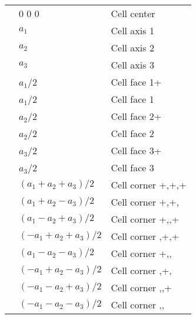 \documentclass[letterpaper,10pt,english]{sphinxmanual}
\begin{document}
\begin{savenotes}\sphinxattablestart
\centering
{}\label{\detokenize{hamiltonianobservable:table8}}\nobreak
\begin{tabulary}{\linewidth}[t]{|T|T|T|}
\hline
\sphinxstyletheadfamily 
{}
&\sphinxstyletheadfamily 
{}
&\sphinxstyletheadfamily 
{}
\\
\hline
{}
&
0 0 0
&
Cell center
\\
\hline
{}
&
\(a_1\)
&
Cell axis 1
\\
\hline
{}
&
\(a_2\)
&
Cell axis 2
\\
\hline
{}
&
\(a_3\)
&
Cell axis 3
\\
\hline
{}
&
\(a_1\)/2
&
Cell face 1+
\\
\hline
{}
&
\sphinxhyphen{}\(a_1\)/2
&
Cell face 1\sphinxhyphen{}
\\
\hline
{}
&
\(a_2\)/2
&
Cell face 2+
\\
\hline
{}
&
\sphinxhyphen{}\(a_2\)/2
&
Cell face 2\sphinxhyphen{}
\\
\hline
{}
&
\(a_3\)/2
&
Cell face 3+
\\
\hline
{}
&
\sphinxhyphen{}\(a_3\)/2
&
Cell face 3\sphinxhyphen{}
\\
\hline
{}
&
\((a_1+a_2+a_3)/2\)
&
Cell corner +,+,+
\\
\hline
{}
&
\((a_1+a_2-a_3)/2\)
&
Cell corner +,+,\sphinxhyphen{}
\\
\hline
{}
&
\((a_1-a_2+a_3)/2\)
&
Cell corner +,\sphinxhyphen{},+
\\
\hline
{}
&
\((-a_1+a_2+a_3)/2\)
&
Cell corner \sphinxhyphen{},+,+
\\
\hline
{}
&
\((a_1-a_2-a_3)/2\)
&
Cell corner +,\sphinxhyphen{},\sphinxhyphen{}
\\
\hline
{}
&
\((-a_1+a_2-a_3)/2\)
&
Cell corner \sphinxhyphen{},+,\sphinxhyphen{}
\\
\hline
{}
&
\((-a_1-a_2+a_3)/2\)
&
Cell corner \sphinxhyphen{},\sphinxhyphen{},+
\\
\hline
{}
&
\((-a_1-a_2-a_3)/2\)
&
Cell corner \sphinxhyphen{},\sphinxhyphen{},\sphinxhyphen{}
\\
\hline
\end{tabulary}
\par
\sphinxattableend\end{savenotes}
\end{document}
